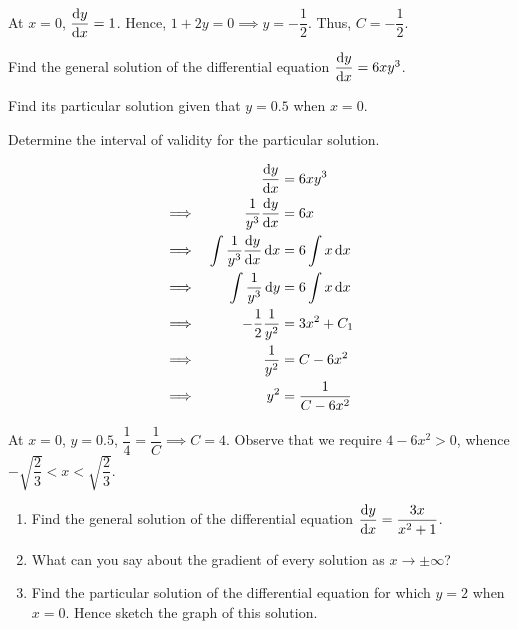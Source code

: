 \documentclass{echw}
\begin{document}
        
        At $x = 0$, $\dfrac{\mathrm{d} y}{\mathrm{d} x} = 1$. Hence, $1 + 2y = 0 \implies y = -\dfrac12$. Thus, $C = -\dfrac12$.


    \problem{}
        Find the general solution of the differential equation $\dfrac{\mathrm{d} y}{\mathrm{d} x} = 6xy^3$.

        Find its particular solution given that $y = 0.5$ when $x = 0$.

        Determine the interval of validity for the particular solution.

    \solution
        \begin{alignat*}{2}
            && \dfrac{\mathrm{d} y}{\mathrm{d} x} &= 6xy^3\\
            \implies&& \dfrac{1}{y^3} \dfrac{\mathrm{d} y}{\mathrm{d} x} &= 6x\\
            \implies&& \int \dfrac{1}{y^3} \dfrac{\mathrm{d} y}{\mathrm{d} x} \mathop{\mathrm{d}x} &= 6 \int x \mathop{\mathrm{d}x}\\
            \implies&& \int \dfrac{1}{y^3} \mathop{\mathrm{d}y} &= 6 \int x \mathop{\mathrm{d}x}\\
            \implies&& -\dfrac12 \dfrac{1}{y^2} &= 3x^2 + C_1 \\
            \implies&& \dfrac{1}{y^2} &= C-6x^2\\
            \implies&& y^2 &= \dfrac{1}{C - 6x^2}
        \end{alignat*}


        At $x = 0$, $y = 0.5$, $\dfrac14 = \dfrac{1}{C} \implies C = 4$.
        Observe that we require $4 - 6x^2 > 0$, whence $-\sqrt{\dfrac23} < x < \sqrt{\dfrac23}$.


    \problem{}
        \begin{enumerate}
            \item Find the general solution of the differential equation $\dfrac{\mathrm{d} y}{\mathrm{d} x} = \dfrac{3x}{x^2 + 1}$.
            \item What can you say about the gradient of every solution as $x \to \pm \infty$?
            \item Find the particular solution of the differential equation for which $y = 2$ when $x = 0$. Hence sketch the graph of this solution.
        \end{enumerate}
\end{document}
